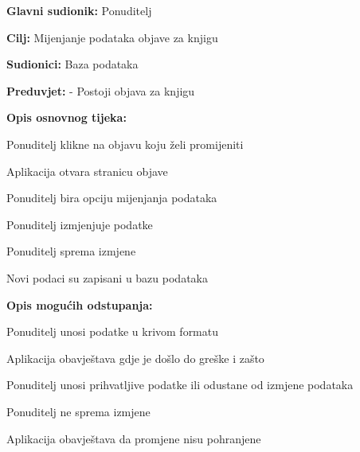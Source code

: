                     \noindent {}
					\begin{packed_item}
	
						\item \textbf{Glavni sudionik: } Ponuditelj
						\item  \textbf{Cilj:} Mijenjanje podataka objave za knjigu
						\item  \textbf{Sudionici:} Baza podataka
						\item  \textbf{Preduvjet:} - Postoji objava za knjigu
						\item  \textbf{Opis osnovnog tijeka:}
						
						\item[] \begin{packed_enum}	
							\item Ponuditelj klikne na objavu koju želi promijeniti
                            					\item Aplikacija otvara stranicu objave
							\item Ponuditelj bira opciju mijenjanja podataka
                            					\item Ponuditelj izmjenjuje podatke
                            					\item Ponuditelj sprema izmjene
                            					\item Novi podaci su zapisani u bazu podataka
						\end{packed_enum}
						
						\item  \textbf{Opis mogućih odstupanja:}
						
						\item[] \begin{packed_item}
	
							\item[2.a] Ponuditelj unosi podatke u krivom formatu
							\item[] \begin{packed_enum}
								
								\item Aplikacija obavještava gdje je došlo do greške i zašto
								\item Ponuditelj unosi prihvatljive podatke ili odustane od izmjene podataka
								
							\end{packed_enum}

                            					\item[2.b] Ponuditelj ne sprema izmjene
                            					\item[] \begin{packed_enum}
                                					\item Aplikacija obavještava da promjene nisu pohranjene	
                            					\end{packed_enum}
						\end{packed_item}
					\end{packed_item}


